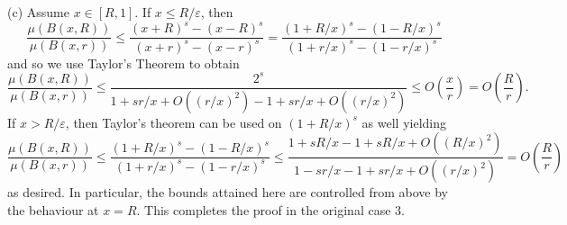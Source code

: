 \noindent (c) Assume  $x \in [R,1]$. If $x \leq R/\varepsilon$, then 
\[
\frac{\mu(B(x,R))}{\mu(B(x,r))} \le \frac{(x+R)^s - (x-R)^s}{(x+r)^s - (x-r)^s} = \frac{(1+R/x)^s - (1-R/x)^s}{(1+r/x)^s - (1-r/x)^s}
\]
and so we use Taylor's Theorem  to obtain
\[
\frac{\mu(B(x,R))}{\mu(B(x,r))} \le \frac{2^s}{1+sr/x + O((r/x)^2)- 1 + sr/x + O((r/x)^2)} \le O\left(\frac{x}{r}\right) = O\left(\frac{R}{r}\right).
\]
If $x > R/\varepsilon$, then  Taylor's theorem can be used on $(1+R/x)^s$ as well yielding
\[
\frac{\mu(B(x,R))}{\mu(B(x,r))} \le \frac{(1+R/x)^s - (1-R/x)^s}{(1+r/x)^s - (1-r/x)^s} \le \frac{1+sR/x - 1 + sR/x + O((R/x)^2)}{1-sr/x -1 + sr/x + O((r/x)^2)} =O\left(\frac{R}{r}\right)
\]
as desired. In particular, the bounds attained here are controlled from above by the  behaviour at $x= R$.   This completes the proof in the original case 3.



